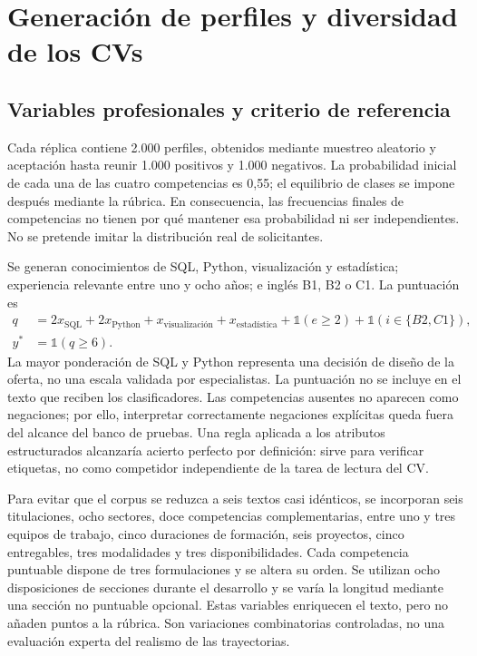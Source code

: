 \documentclass[11pt,a4paper,oneside]{report}
\begin{document}
\section{Generación de perfiles y diversidad de los CVs}
\subsection{Variables profesionales y criterio de referencia}
Cada réplica contiene 2.000 perfiles, obtenidos mediante muestreo aleatorio y aceptación hasta reunir 1.000 positivos y 1.000 negativos. La probabilidad inicial de cada una de las cuatro competencias es 0,55; el equilibrio de clases se impone después mediante la rúbrica. En consecuencia, las frecuencias finales de competencias no tienen por qué mantener esa probabilidad ni ser independientes. No se pretende imitar la distribución real de solicitantes.

Se generan conocimientos de SQL, Python, visualización y estadística; experiencia relevante entre uno y ocho años; e inglés B1, B2 o C1. La puntuación es
\begin{equation}
 \begin{aligned}q&=2x_{\mathrm{SQL}}+2x_{\mathrm{Python}}+x_{\mathrm{visualización}}+x_{\mathrm{estadística}}+\mathbb{1}(e\geq2)+\mathbb{1}(i\in\{B2,C1\}),\\ y^*&=\mathbb{1}(q\geq6).\end{aligned}
\end{equation}
La mayor ponderación de SQL y Python representa una decisión de diseño de la oferta, no una escala validada por especialistas. La puntuación no se incluye en el texto que reciben los clasificadores. Las competencias ausentes no aparecen como negaciones; por ello, interpretar correctamente negaciones explícitas queda fuera del alcance del banco de pruebas. Una regla aplicada a los atributos estructurados alcanzaría acierto perfecto por definición: sirve para verificar etiquetas, no como competidor independiente de la tarea de lectura del CV.

Para evitar que el corpus se reduzca a seis textos casi idénticos, se incorporan seis titulaciones, ocho sectores, doce competencias complementarias, entre uno y tres equipos de trabajo, cinco duraciones de formación, seis proyectos, cinco entregables, tres modalidades y tres disponibilidades. Cada competencia puntuable dispone de tres formulaciones y se altera su orden. Se utilizan ocho disposiciones de secciones durante el desarrollo y se varía la longitud mediante una sección no puntuable opcional. Estas variables enriquecen el texto, pero no añaden puntos a la rúbrica. Son variaciones combinatorias controladas, no una evaluación experta del realismo de las trayectorias.
\end{document}
